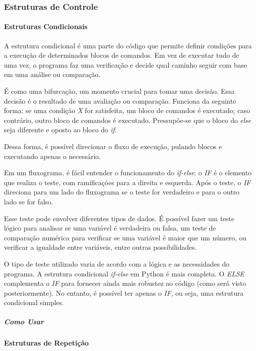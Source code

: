 \documentclass[a4paper, 12pt, onecolumn,singlespacing]{article}
\begin{document}
	\subsubsection{Estruturas de Controle}
	
	\paragraph{Estruturas Condicionais}
	A estrutura condicional é uma parte do código que permite definir condições para a execução de determinados blocos de comandos. Em vez de executar tudo de uma vez, o programa faz uma verificação e decide qual caminho seguir com base em uma análise ou comparação.
	
	É como uma bifurcação, um momento crucial para tomar uma decisão. Essa decisão é o resultado de uma avaliação ou comparação. Funciona da seguinte forma: se uma condição \textit{X} for satisfeita, um bloco de comandos é executado; caso contrário, outro bloco de comandos é executado. Pressupõe-se que o bloco do \textit{else} seja diferente e oposto ao bloco do \textit{if}.
	
	Dessa forma, é possível direcionar o fluxo de execução, pulando blocos e executando apenas o necessário.
	
	Em um fluxograma, é fácil entender o funcionamento do \textit{if-else}: o \textit{IF} é o elemento que realiza o teste, com ramificações para a direita e esquerda. Após o teste, o \textit{IF} direciona para um lado do fluxograma se o teste for verdadeiro e para o outro lado se for falso.
	
	Esse teste pode envolver diferentes tipos de dados. É possível fazer um teste lógico para analisar se uma variável é verdadeira ou falsa, um teste de comparação numérica para verificar se uma variável é maior que um número, ou verificar a igualdade entre variáveis, entre outras possibilidades.
	
	O tipo de teste utilizado varia de acordo com a lógica e as necessidades do programa. A estrutura condicional \textit{if-else} em Python é mais completa. O \textit{ELSE} complementa o \textit{IF} para fornecer ainda mais robustez ao código (como será visto posteriormente). No entanto, é possível ter apenas o \textit{IF}, ou seja, uma estrutura condicional simples.
	
	\subparagraph{Como Usar }
	\paragraph{Estruturas de Repetição}
	
\end{document}
